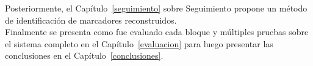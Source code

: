 Posteriormente, el Capítulo~\ref{seguimiento} sobre Seguimiento propone un método de identificación de marcadores reconstruidos. 
\\

Finalmente se presenta como fue evaluado cada bloque y múltiples pruebas sobre el sistema completo en el Capítulo~\ref{evaluacion} para luego presentar las conclusiones en el Capítulo~\ref{conclusiones}.


 
  


